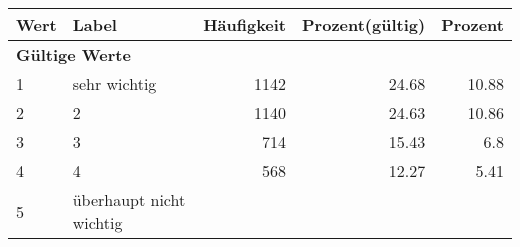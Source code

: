      \begin{longtable}{lXrrr}
     \toprule
     \textbf{Wert} & \textbf{Label} & \textbf{Häufigkeit} & \textbf{Prozent(gültig)} & \textbf{Prozent} \\
     \endhead
     \midrule
     \multicolumn{5}{l}{\textbf{Gültige Werte}}\\

     1 &
     \multicolumn{1}{X}{ sehr wichtig   } &


       \num{1142} &
       \num[round-mode=places,round-precision=2]{24,68} &
         \num[round-mode=places,round-precision=2]{10,88} \\

     2 &
     \multicolumn{1}{X}{ 2   } &


       \num{1140} &
       \num[round-mode=places,round-precision=2]{24,63} &
         \num[round-mode=places,round-precision=2]{10,86} \\

     3 &
     \multicolumn{1}{X}{ 3   } &


       \num{714} &
       \num[round-mode=places,round-precision=2]{15,43} &
         \num[round-mode=places,round-precision=2]{6,8} \\

     4 &
     \multicolumn{1}{X}{ 4   } &


       \num{568} &
       \num[round-mode=places,round-precision=2]{12,27} &
         \num[round-mode=places,round-precision=2]{5,41} \\

     5 &
     \multicolumn{1}{X}{ überhaupt nicht wichtig   } &



\end{longtable}
